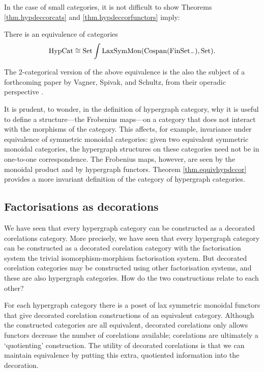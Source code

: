 In the case of small categories, it is not difficult to show Theorems
\ref{thm.hypdeccorcats} and \ref{thm.hypdeccorfunctors} imply:

\begin{theorem} \label{thm.equivhypdccor}
  There is an equivalence of categories
\[
  \mathrm{HypCat} \cong \mathrm{Set}\int \mathrm{LaxSymMon}(\operatorname{{Cospan}}(\mathrm{FinSet}_{-}), \mathrm{Set}).
\]
\end{theorem}

The 2-categorical version of the above equivalence is the also the subject of a
forthcoming paper by Vagner, Spivak, and Schultz, from their operadic
perspective \cite{VSS}.

\begin{remark}
  It is prudent, to wonder, in the definition of hypergraph category, why it is
  useful to define a structure---the Frobenius maps---on a category that does
  not interact with the morphisms of the category. This affects, for example,
  invariance under equivalence of symmetric monoidal categories: given two
  equivalent symmetric monoidal categories, the hypergraph structures on these
  categories need not be in one-to-one correspondence. The Frobenius maps,
  however, are seen by the monoidal product and by hypergraph functors. Theorem
  \ref{thm.equivhypdccor} provides a more invariant definition of the category
  of hypergraph categories.
\end{remark}

\subsection{Factorisations as decorations}

We have seen that every hypergraph category can be constructed as a decorated
corelations category. More precisely, we have seen that every hypergraph
category can be constructed as a decorated corelation category with the
factorisation system the trivial isomorphism-morphism factorisation system. But
decorated corelation categories may be constructed using other factorisation
systems, and these are also hypergraph categories. How do the two constructions
relate to each other?

For each hypergraph category there is a poset of lax symmetric monoidal functors
that give decorated corelation constructions of an equivalent category.
Although the constructed categories are all equivalent, decorated corelations
only allows functors decrease the number of corelations available; corelations
are ultimately a `quotienting' construction.  The utility of decorated
corelations is that we can maintain equivalence by putting this extra,
quotiented information into the decoration.

